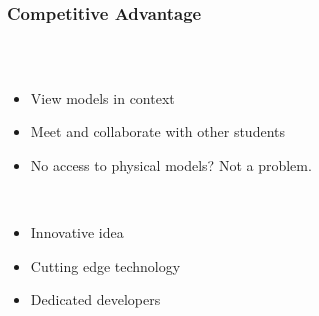 \begin{frame}
  \frametitle{Competitive Advantage}
  \begin{columns}
    \begin{column}{0.8\textwidth}
      \begin{description}[]
        \item[Integration of Course room and Model Viewing] \hfill \\
        \begin{itemize}
          \item View models in context
          \item Meet and collaborate with other students
          \item No access to physical models? Not a problem.
        \end{itemize}

        \bigskip
        \item[Our Strengths ] \hfill \\
          \begin{itemize}
            \item Innovative idea
            \item Cutting edge technology
            \item Dedicated developers
        \end{itemize}
      \end{description}
    \end{column}


\end{columns}
\end{frame}
